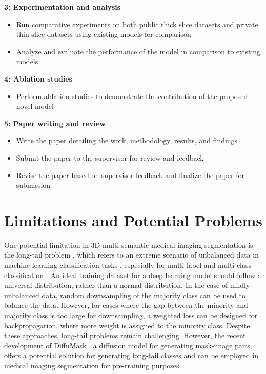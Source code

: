 \documentclass{article}
\begin{document}
\textbf{3: Experimentation and analysis}

\begin{itemize}
    \item Run comparative experiments on both public thick slice datasets and private thin slice datasets using existing models for comparison
    \item Analyze and evaluate the performance of the model in comparison to existing models
\end{itemize}

\textbf{4: Ablation studies}

\begin{itemize}
    \item Perform ablation studies to demonstrate the contribution of the proposed novel model
\end{itemize}

\textbf{5: Paper writing and review}

\begin{itemize}
    \item Write the paper detailing the work, methodology, results, and findings
    \item Submit the paper to the supervisor for review and feedback
    \item Revise the paper based on supervisor feedback and finalize the paper for submission
\end{itemize}

\section{Limitations and Potential Problems}

One potential limitation in 3D multi-semantic medical imaging segmentation is the long-tail problem \cite{36,37}, which refers to an extreme scenario of unbalanced data in machine learning classification tasks \cite{zhang2024jointvit,qi2025medconv}, especially for multi-label and multi-class classification \cite{wu2024xlip}. An ideal training dataset for a deep learning model should follow a universal distribution, rather than a normal distribution. In the case of mildly unbalanced data, random downsampling \cite{38} of the majority class can be used to balance the data. However, for cases where the gap between the minority and majority class is too large for downsampling, a weighted loss \cite{39} can be designed for backpropagation, where more weight is assigned to the minority class. Despite these approaches, long-tail problems remain challenging. However, the recent development of DiffuMask \cite{40}, a diffusion model for generating mask-image pairs, offers a potential solution for generating long-tail classes and can be employed in medical imaging segmentation for pre-training purposes.
\end{document}
